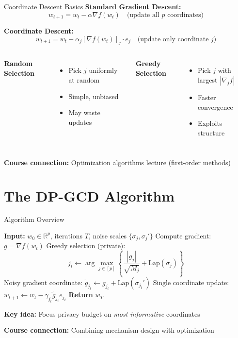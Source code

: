 \documentclass[10pt]{beamer}
\begin{document}
\begin{frame}{Coordinate Descent Basics}
\textbf{Standard Gradient Descent:}
\[
w_{t+1} = w_t - \alpha \nabla f(w_t) \quad \text{(update all $p$ coordinates)}
\]

\vspace{1em}
\textbf{Coordinate Descent:}
\[
w_{t+1} = w_t - \alpha_j [\nabla f(w_t)]_j \cdot e_j \quad \text{(update only coordinate $j$)}
\]

\vspace{1em}
\begin{columns}[T]
\textbf{Random Selection}
\begin{itemize}
\item Pick $j$ uniformly at random
\item Simple, unbiased
\item May waste updates
\end{itemize}

\textbf{Greedy Selection}
\begin{itemize}
\item Pick $j$ with largest $|\nabla_j f|$
\item Faster convergence
\item Exploits structure
\end{itemize}
\end{columns}

\vspace{0.5em}
\textbf{Course connection:} Optimization algorithms lecture (first-order methods)
\end{frame}

\section{The DP-GCD Algorithm}

\begin{frame}{Algorithm Overview}
\begin{algorithm}[H]
\caption{DP-GCD (Simplified)}
\footnotesize
\begin{algorithmic}[1]
\State \textbf{Input:} $w_0 \in \mathbb{R}^p$, iterations $T$, noise scales $\{\sigma_j, \sigma_j'\}$
    \State Compute gradient: $g = \nabla f(w_t)$
    \State \alert{Greedy selection (private):} 
    \[j_t \leftarrow \arg\max_{j \in [p]} \left\{ \frac{|g_j|}{\sqrt{M_j}} + \text{Lap}(\sigma_j) \right\}\]
    \State \alert{Noisy gradient coordinate:} $\tilde{g}_{j_t} \leftarrow g_{j_t} + \text{Lap}(\sigma_{j_t}')$
    \State \alert{Single coordinate update:} $w_{t+1} \leftarrow w_t - \gamma_{j_t} \tilde{g}_{j_t} e_{j_t}$
\EndFor
\State \textbf{Return} $w_T$
\end{algorithmic}
\end{algorithm}

\vspace{0.5em}
\textbf{Key idea:} Focus privacy budget on \emph{most informative} coordinates

\vspace{0.3em}
\textbf{Course connection:} Combining mechanism design with optimization
\end{frame}
\end{document}

